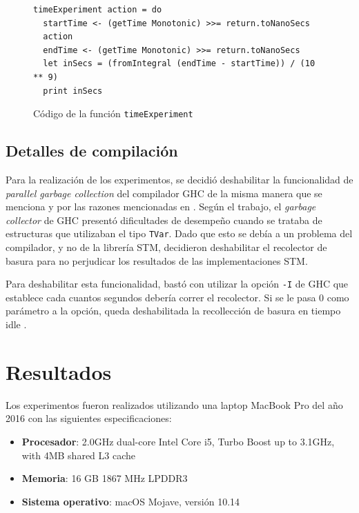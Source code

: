 \begin{figure}[H]
    \centering
\begin{verbatim}
timeExperiment action = do
  startTime <- (getTime Monotonic) >>= return.toNanoSecs
  action
  endTime <- (getTime Monotonic) >>= return.toNanoSecs
  let inSecs = (fromIntegral (endTime - startTime)) / (10 ** 9)
  print inSecs
\end{verbatim}
\caption{Código de la función \texttt{timeExperiment}}
    \label{fig:timeExperiment}
\end{figure}

\subsection{Detalles de compilación}
Para la realización de los experimentos, se decidió deshabilitar la funcionalidad de \emph{parallel garbage collection} del compilador GHC de la misma manera que se menciona y por las razones mencionadas en \cite{linked-list}.
Según el trabajo, el \emph{garbage collector} de GHC presentó dificultades de desempeño cuando se trataba de estructuras que utilizaban el tipo \texttt{TVar}. Dado que esto se debía a un problema del compilador, y no de la librería STM, decidieron deshabilitar el recolector de basura para no perjudicar los resultados de las implementaciones STM.

Para deshabilitar esta funcionalidad, bastó con utilizar la opción \texttt{-I} de GHC que establece cada cuantos segundos debería correr el recolector. Si se le pasa 0 como parámetro a la opción, queda deshabilitada la recollección de basura en tiempo idle \cite{garbagecollection}.

\section{Resultados}\label{sec:results}

Los experimentos fueron realizados utilizando una laptop MacBook Pro del año 2016 con las siguientes especificaciones:

\begin{itemize}
    \item \textbf{Procesador}: 2.0GHz dual-core Intel Core i5, Turbo Boost up to 3.1GHz, with 4MB shared L3 cache
    \item \textbf{Memoria}: 16 GB 1867 MHz LPDDR3
    \item \textbf{Sistema operativo}: macOS Mojave, versión 10.14
\end{itemize}

